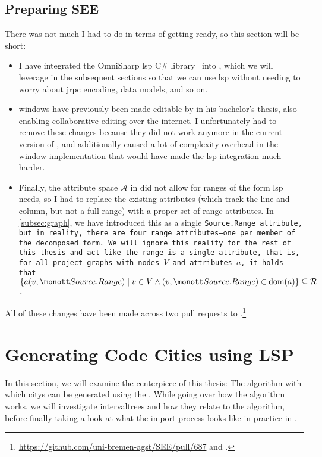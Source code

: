 \documentclass[../thesis]{subfiles}
\begin{document}
\subsection{Preparing SEE}
There was not much I had to do in terms of getting \SEE{} ready, so this section will be short:
\begin{itemize}
	\item I have integrated the OmniSharp \gls{lsp} C\# library~\cite{csharplanguageserverprotocol2023} into \SEE{}, which we will leverage in the subsequent sections so that we can use \gls{lsp} without needing to worry about \gls{jrpc} encoding, data models, and so on.
	\item \Glspl{window} have previously been made editable by \textcite{moritz} in his bachelor's thesis, also enabling collaborative editing over the internet.
	      I unfortunately had to remove these changes because they did not work anymore in the current version of \SEE{}, and additionally caused a lot of complexity overhead in the \gls{window} implementation that would have made the \gls{lsp} integration much harder.
	\item Finally, the attribute space $\mathcal{A}$ in \SEE{} did not allow for \glspl{range} of the form \gls{lsp} needs, so I had to replace the existing attributes (which track the line and column, but not a full range) with a proper set of \gls{range} attributes.
	      In \cref{subsec:graph}, we have introduced this as a single \tt{Source.Range} attribute, but in reality, there are four \gls{range} attributes---one per member of the decomposed form.
	      We will ignore this reality for the rest of this thesis and act like the \gls{range} is a single attribute, that is, for all project graphs with nodes $V$ and attributes $a$, it holds that $\{a(v, \tt{Source.Range}) \mid v \in V \land (v, \tt{Source.Range}) \in \mathrm{dom}(a) \} \subseteq \mathcal{R}$.
\end{itemize}

All of these changes have been made across two pull requests to \SEE{}.\footnote{
	\url{https://github.com/uni-bremen-agst/SEE/pull/687} and .
}

\section{Generating Code Cities using LSP}\label{sec:generate}
In this section, we will examine the centerpiece of this thesis:
The algorithm with which \glspl{city} can be generated using the .
While going over how the algorithm works, we will investigate \glspl{intervaltree} and how they relate to the algorithm, before finally taking a look at what the import process looks like in practice in \SEE{}.
\end{document}
